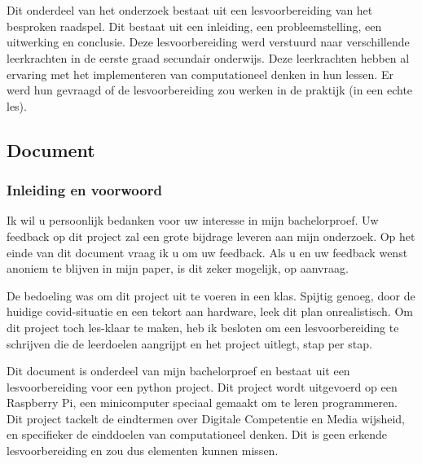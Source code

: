 
\chapter{}
\label{ch:lesvoorbereiding}

Dit onderdeel van het onderzoek bestaat uit een lesvoorbereiding van het besproken raadspel. Dit bestaat uit een inleiding, een probleemstelling, een uitwerking en conclusie. Deze lesvoorbereiding werd verstuurd naar verschillende leerkrachten in de eerste graad secundair onderwijs. Deze leerkrachten hebben al ervaring met het implementeren van computationeel denken in hun lessen. Er werd hun gevraagd of de lesvoorbereiding zou werken in de praktijk (in een echte les). 

\section{Document}

\subsection{Inleiding en voorwoord}
Ik wil u persoonlijk bedanken voor uw interesse in mijn bachelorproef. Uw feedback op dit project zal een grote bijdrage leveren aan mijn onderzoek. Op het einde van dit document vraag ik u om uw feedback. Als u en uw feedback wenst anoniem te blijven in mijn paper, is dit zeker mogelijk, op aanvraag.

De bedoeling was om dit project uit te voeren in een klas. Spijtig genoeg, door de huidige covid-situatie en een tekort aan hardware, leek dit plan onrealistisch. Om dit project toch les-klaar te maken, heb ik besloten om een lesvoorbereiding te schrijven die de leerdoelen aangrijpt en het project uitlegt, stap per stap.

Dit document is onderdeel van mijn bachelorproef en bestaat uit een lesvoorbereiding voor een python project. Dit project wordt uitgevoerd op een Raspberry Pi, een minicomputer speciaal gemaakt om te leren programmeren. Dit project tackelt de eindtermen over Digitale Competentie en Media wijsheid, en specifieker de einddoelen van computationeel denken. Dit is geen erkende lesvoorbereiding en zou dus elementen kunnen missen.

